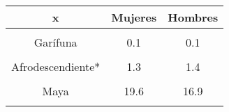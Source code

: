 	\begin{tabular}{c>{}cc}
		\toprule
		\textbf{x} & \textbf{Mujeres} & \textbf{Hombres}\\
		\midrule
		\cellcolor[HTML]{B6B3FF}{Xinka} & \cellcolor[HTML]{B6B3FF}{0.7} & \cellcolor[HTML]{B6B3FF}{0.6}\\
		Garífuna & 0.1 & 0.1\\
		\cellcolor[HTML]{B6B3FF}{Ladino} & \cellcolor[HTML]{B6B3FF}{31.2} & \cellcolor[HTML]{B6B3FF}{27.8}\\
		Afrodescendiente* & 1.3 & 1.4\\
		\cellcolor[HTML]{B6B3FF}{Extranjero} & \cellcolor[HTML]{B6B3FF}{0.1} & \cellcolor[HTML]{B6B3FF}{0.2}\\
		Maya & 19.6 & 16.9\\
		\bottomrule
		\\[0.25cm]
	\end{tabular}